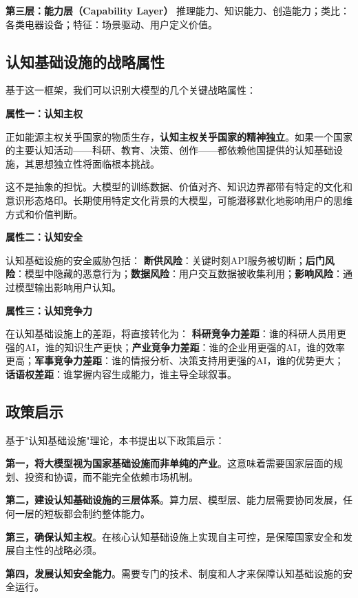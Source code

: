 \textbf{第三层：能力层（Capability Layer）}
推理能力、知识能力、创造能力；类比：各类电器设备；特征：场景驱动、用户定义价值。

\subsection{认知基础设施的战略属性}

基于这一框架，我们可以识别大模型的几个关键战略属性：

\textbf{属性一：认知主权}

正如能源主权关乎国家的物质生存，\textbf{认知主权关乎国家的精神独立}。如果一个国家的主要认知活动——科研、教育、决策、创作——都依赖他国提供的认知基础设施，其思想独立性将面临根本挑战。

这不是抽象的担忧。大模型的训练数据、价值对齐、知识边界都带有特定的文化和意识形态烙印。长期使用特定文化背景的大模型，可能潜移默化地影响用户的思维方式和价值判断。

\textbf{属性二：认知安全}

认知基础设施的安全威胁包括：
\textbf{断供风险}：关键时刻API服务被切断；\textbf{后门风险}：模型中隐藏的恶意行为；\textbf{数据风险}：用户交互数据被收集利用；\textbf{影响风险}：通过模型输出影响用户认知。

\textbf{属性三：认知竞争力}

在认知基础设施上的差距，将直接转化为：
\textbf{科研竞争力差距}：谁的科研人员用更强的AI，谁的知识生产更快；\textbf{产业竞争力差距}：谁的企业用更强的AI，谁的效率更高；\textbf{军事竞争力差距}：谁的情报分析、决策支持用更强的AI，谁的优势更大；\textbf{话语权差距}：谁掌握内容生成能力，谁主导全球叙事。

\subsection{政策启示}

基于"认知基础设施"理论，本书提出以下政策启示：

\textbf{第一，将大模型视为国家基础设施而非单纯的产业}。这意味着需要国家层面的规划、投资和协调，而不能完全依赖市场机制。

\textbf{第二，建设认知基础设施的三层体系}。算力层、模型层、能力层需要协同发展，任何一层的短板都会制约整体能力。

\textbf{第三，确保认知主权}。在核心认知基础设施上实现自主可控，是保障国家安全和发展自主性的战略必须。

\textbf{第四，发展认知安全能力}。需要专门的技术、制度和人才来保障认知基础设施的安全运行。

